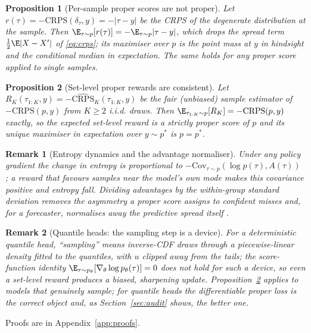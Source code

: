 \documentclass{article}
\newtheorem{proposition}{Proposition}
\newtheorem{remark}{Remark}
\newcommand{\crps}{\mathrm{CRPS}}
\begin{document}
\begin{proposition}[Per-sample proper scores are not proper]
\label{prop:persample}
Let $r(\tau)=-\crps(\delta_\tau,y)=-|\tau-y|$ be the CRPS of the degenerate distribution at the sample. Then $\E_{\tau\sim p}[r(\tau)]=-\E_{\tau\sim p}|\tau-y|$, which drops the spread term $\tfrac12\E|X-X'|$ of \eqref{eq:crps}; its maximiser over $p$ is the point mass at $y$ in hindsight and the conditional median in expectation. The same holds for any proper score applied to single samples.
\end{proposition}

\begin{proposition}[Set-level proper rewards are consistent]
\label{prop:set}
Let $R_K(\tau_{1:K},y)=-\widehat{\crps}_K(\tau_{1:K},y)$ be the fair (unbiased) sample estimator of $-\crps(p,y)$ from $K\ge2$ i.i.d. draws. Then $\E_{\tau_{1:K}\sim p}[R_K]=-\crps(p,y)$ exactly, so the expected set-level reward is a strictly proper score of $p$ and its unique maximiser in expectation over $y\sim p^*$ is $p=p^*$.
\end{proposition}

\begin{remark}[Entropy dynamics and the advantage normaliser]
Under any policy gradient the change in entropy is proportional to $-\mathrm{Cov}_{\tau\sim p}(\log p(\tau), A(\tau))$ \citep{cui2025entropy}; a reward that favours samples near the model's own mode makes this covariance positive and entropy fall. Dividing advantages by the within-group standard deviation removes the asymmetry a proper score assigns to confident misses and, for a forecaster, normalises away the predictive spread itself \citep{turtel2025outcome,bereket2025uncalibrated}.
\end{remark}

\begin{remark}[Quantile heads: the sampling step is a device]
\label{rem:device}
For a deterministic quantile head, ``sampling'' means inverse-CDF draws through a piecewise-linear density fitted to the quantiles, with $u$ clipped away from the tails; the score-function identity $\E_{\tau\sim p_\theta}[\nabla_\theta\log p_\theta(\tau)]=0$ does not hold for such a device, so even a set-level reward produces a biased, sharpening update. Proposition~\ref{prop:set} applies to models that genuinely sample; for quantile heads the differentiable proper loss is the correct object and, as Section~\ref{sec:audit} shows, the better one.
\end{remark}
Proofs are in Appendix~\ref{app:proofs}.
\end{document}
